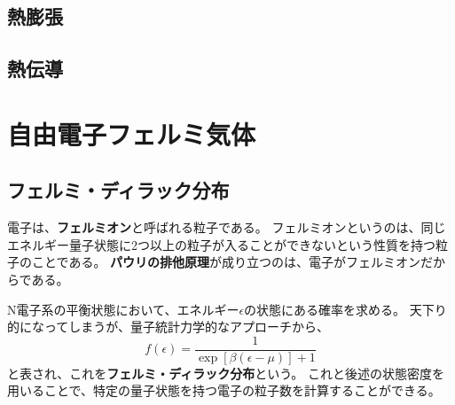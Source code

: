 \documentclass[a4paper]{jsreport}
\begin{document}
        \section{熱膨張}
        \section{熱伝導}

    \chapter{自由電子フェルミ気体}
        \section{フェルミ・ディラック分布}
            電子は、\textbf{フェルミオン}と呼ばれる粒子である。
            フェルミオンというのは、同じエネルギー量子状態に2つ以上の粒子が入ることができないという性質を持つ粒子のことである。
            \textbf{パウリの排他原理}が成り立つのは、電子がフェルミオンだからである。\par
             N電子系の平衡状態において、エネルギー$\epsilon$の状態にある確率を求める。
             天下り的になってしまうが、量子統計力学的なアプローチから、
             \begin{equation}
                f(\epsilon) = \frac{1}{\exp[\beta(\epsilon - \mu)] + 1}
             \end{equation}
             と表され、これを\textbf{フェルミ・ディラック分布}という。
             これと後述の状態密度を用いることで、特定の量子状態を持つ電子の粒子数を計算することができる。
\end{document}
